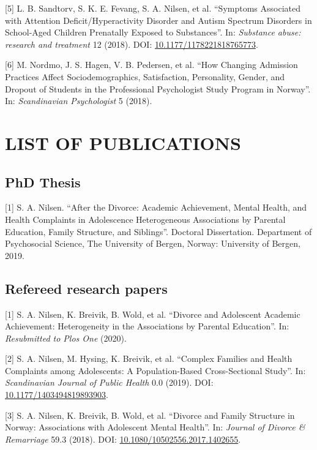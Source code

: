 \documentclass[]{article}
\begin{document}
{[}5{]} L. B. Sandtorv, S. K. E. Fevang, S. A. Nilsen, et al. ``Symptoms
Associated with Attention Deficit/Hyperactivity Disorder and Autism
Spectrum Disorders in School-Aged Children Prenatally Exposed to
Substances''. In: \emph{Substance abuse: research and treatment} 12
(2018). DOI:
\href{https://doi.org/10.1177/1178221818765773}{10.1177/1178221818765773}.

{[}6{]} M. Nordmo, J. S. Hagen, V. B. Pedersen, et al. ``How Changing
Admission Practices Affect Sociodemographics, Satisfaction, Personality,
Gender, and Dropout of Students in the Professional Psychologist Study
Program in Norway''. In: \emph{Scandinavian Psychologist} 5 (2018).

\newpage

\hypertarget{list-of-publications}{%
\section{LIST OF PUBLICATIONS}\label{list-of-publications}}

\hypertarget{phd-thesis}{%
\subsection{PhD Thesis}\label{phd-thesis}}

{[}1{]} S. A. Nilsen. ``After the Divorce: Academic Achievement, Mental
Health, and Health Complaints in Adolescence Heterogeneous Associations
by Parental Education, Family Structure, and Siblings''. Doctoral
Dissertation. Department of Psychosocial Science, The University of
Bergen, Norway: University of Bergen, 2019.

\hypertarget{refereed-research-papers}{%
\subsection{Refereed research papers}\label{refereed-research-papers}}

{[}1{]} S. A. Nilsen, K. Breivik, B. Wold, et al. ``Divorce and
Adolescent Academic Achievement: Heterogeneity in the Associations by
Parental Education''. In: \emph{Resubmitted to Plos One} (2020).

{[}2{]} S. A. Nilsen, M. Hysing, K. Breivik, et al. ``Complex Families
and Health Complaints among Adolescents: A Population-Based
Cross-Sectional Study''. In: \emph{Scandinavian Journal of Public
Health} 0.0 (2019). DOI:
\href{https://doi.org/10.1177/1403494819893903}{10.1177/1403494819893903}.

{[}3{]} S. A. Nilsen, K. Breivik, B. Wold, et al. ``Divorce and Family
Structure in Norway: Associations with Adolescent Mental Health''. In:
\emph{Journal of Divorce \& Remarriage} 59.3 (2018). DOI:
\href{https://doi.org/10.1080/10502556.2017.1402655}{10.1080/10502556.2017.1402655}.
\end{document}
